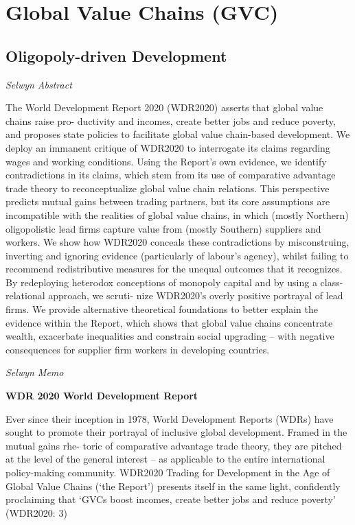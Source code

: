 \documentclass[
]{book}
\begin{document}
\hypertarget{global-value-chains-gvc}{%
\section{Global Value Chains (GVC)}\label{global-value-chains-gvc}}

\hypertarget{oligopoly-driven-development}{%
\subsection{Oligopoly-driven Development}\label{oligopoly-driven-development}}

\emph{Selwyn Abstract}

The World Development Report 2020 (WDR2020) asserts that global value chains raise pro-
ductivity and incomes, create better jobs and reduce poverty, and proposes state policies to
facilitate global value chain-based development. We deploy an immanent critique of WDR2020 to
interrogate its claims regarding wages and working conditions. Using the Report's own evidence,
we identify contradictions in its claims, which stem from its use of comparative advantage trade
theory to reconceptualize global value chain relations. This perspective predicts mutual gains
between trading partners, but its core assumptions are incompatible with the realities of global
value chains, in which (mostly Northern) oligopolistic lead firms capture value from (mostly
Southern) suppliers and workers. We show how WDR2020 conceals these contradictions by
misconstruing, inverting and ignoring evidence (particularly of labour's agency), whilst failing to
recommend redistributive measures for the unequal outcomes that it recognizes. By redeploying
heterodox conceptions of monopoly capital and by using a class-relational approach, we scruti-
nize WDR2020's overly positive portrayal of lead firms. We provide alternative theoretical
foundations to better explain the evidence within the Report, which shows that global value
chains concentrate wealth, exacerbate inequalities and constrain social upgrading -- with negative
consequences for supplier firm workers in developing countries.

\emph{Selwyn Memo}

\textbf{WDR 2020 World Development Report}

Ever since their inception in 1978, World Development Reports (WDRs) have sought to
promote their portrayal of inclusive global development. Framed in the mutual gains rhe-
toric of comparative advantage trade theory, they are pitched at the level of the general
interest -- as applicable to the entire international policy-making community. WDR2020
Trading for Development in the Age of Global Value Chains (`the Report') presents itself in
the same light, confidently proclaiming that `GVCs boost incomes, create better jobs and
reduce poverty' (WDR2020: 3)
\end{document}
